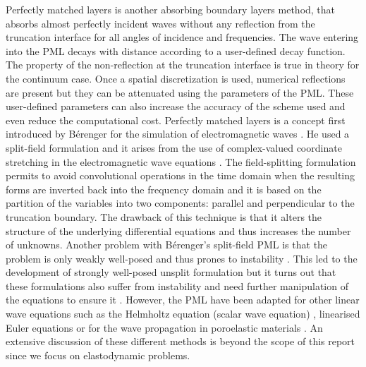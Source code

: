 Perfectly matched layers is another absorbing boundary layers method, that absorbs almost perfectly incident waves without any reflection from the truncation interface for all angles of incidence and frequencies. The wave entering into the PML decays with distance according to a user-defined decay function. The property of the non-reflection at the truncation interface is true in theory for the continuum case. Once a spatial discretization is used, numerical reflections are present but they can be attenuated using the parameters of the PML. These user-defined parameters can also increase the accuracy of the scheme used and even reduce the computational cost. Perfectly matched layers is a concept first introduced by Bérenger for the simulation of electromagnetic waves \cite{Berenger}. He used a split-field formulation and it arises from the use of complex-valued coordinate stretching in the electromagnetic wave equations \cite{Chew}. The field-splitting formulation permits to avoid convolutional operations in the time domain when the resulting forms are inverted back into the frequency domain and it is based on the partition of the variables into two components: parallel and perpendicular to the truncation boundary.  The drawback of this technique is that it alters the structure of the underlying differential equations and thus increases the number of unknowns. Another problem with Bérenger's split-field PML is that the problem is only weakly well-posed and thus prones to instability \cite{Abarbanel2}. This led to the development of strongly well-posed unsplit formulation \cite{Abarbanel1} but it turns out that these formulations also suffer from instability and need further manipulation of the equations to ensure it \cite{Abarbanel3}. However, the PML have been adapted for other linear wave equations such as the Helmholtz equation (scalar wave equation) \cite{Qi,Turkel,Harari}, linearised Euler equations \cite{Hu} or for the wave propagation in poroelastic materials \cite{Zeng}. An extensive discussion of these different methods is beyond the scope of this report since we focus on elastodynamic problems. \\
